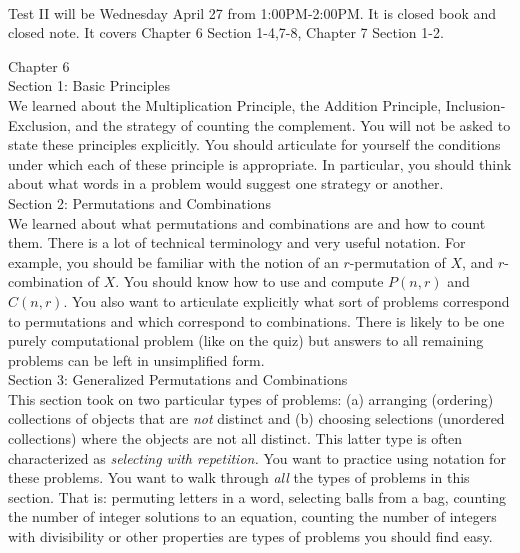\documentclass[12pt]{article}
\begin{document}
\thispagestyle{fancy}
\quad\\

Test II will be Wednesday April 27 from 1:00PM-2:00PM. It is closed book and closed note. It covers Chapter 6 Section 1-4,7-8, Chapter 7 Section 1-2. \\

\noindent\hrulefill

Chapter 6\\

Section 1: Basic Principles\\
We learned about the Multiplication Principle, the Addition Principle,  Inclusion-Exclusion, and the strategy of counting the complement. You will not be asked to state these principles explicitly. You should articulate for yourself the conditions under which each of these principle is appropriate. In particular, you should think about what words in a problem would suggest  one strategy or another. \\

Section 2: Permutations and Combinations\\
We learned about what permutations and combinations are and how to count them. There is a lot of technical terminology and very useful notation. For example, you should be familiar with the notion of an $r$-permutation of $X$, and $r$-combination of $X$. You should know how to use and compute $P(n,r)$ and $C(n,r).$ You also want to articulate explicitly what sort of problems correspond to permutations and which correspond to combinations. There is likely to be one purely computational problem (like on the quiz) but answers to all remaining problems can be left in unsimplified form.\\

Section 3: Generalized Permutations and Combinations\\
This section took on two particular types of problems: (a) arranging (ordering) collections of objects that are \emph{not} distinct and (b) choosing selections (unordered collections) where the objects are not all distinct. This latter type is often characterized as \emph{selecting with repetition.} You want to practice using notation for these problems. You want to walk through \emph{all} the types of problems in this section. That is: permuting letters in a word, selecting balls from a bag, counting the number of integer solutions to an equation, counting the number of integers with divisibility or other properties are types of problems you should find easy.\\
\end{document}
